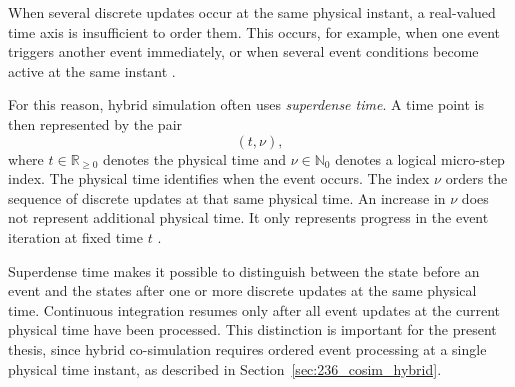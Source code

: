 When several discrete updates occur at the same physical instant, a real-valued time axis is insufficient to order them.
This occurs, for example, when one event triggers another event immediately, or when several event conditions become active at the same instant \cite{urquia_moraleda_modeling_2018}.

For this reason, hybrid simulation often uses \emph{superdense time}.
A time point is then represented by the pair
\begin{equation}
    (t,\nu),
\end{equation}
where $t \in \mathbb{R}_{\geq 0}$ denotes the physical time and $\nu \in \mathbb{N}_0$ denotes a logical micro-step index.
The physical time identifies when the event occurs.
The index $\nu$ orders the sequence of discrete updates at that same physical time.
An increase in $\nu$ does not represent additional physical time.
It only represents progress in the event iteration at fixed time $t$ \cite{broman_determinate_2013,cremona_hybrid_2019}.

Superdense time makes it possible to distinguish between the state before an event and the states after one or more discrete updates at the same physical time.
Continuous integration resumes only after all event updates at the current physical time have been processed.
This distinction is important for the present thesis, since hybrid co-simulation requires ordered event processing at a single physical time instant, as described in Section~\ref{sec:236_cosim_hybrid}.